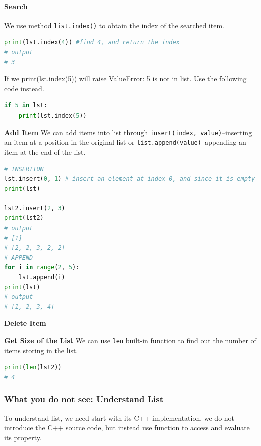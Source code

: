 \documentclass[../main.tex]{subfiles}
\begin{document}
\paragraph{Search} We use method \texttt{list.index()} to obtain the index of the searched item. 
\begin{lstlisting}[language = Python]
print(lst.index(4)) #find 4, and return the index
# output
# 3 
\end{lstlisting}
If we print(lst.index(5)) will raise ValueError: 5 is not in list. Use the following code instead.
\begin{lstlisting}[language=Python]
if 5 in lst:
    print(lst.index(5))
\end{lstlisting}
\textbf{Add Item } We can add items into list through \texttt{insert(index, value)}--inserting an item at a position in the original list or \texttt{list.append(value)}--appending an item at the end of the list. 
\begin{lstlisting}[language = Python]
# INSERTION
lst.insert(0, 1) # insert an element at index 0, and since it is empty lst.insert(1, 1) has the same effect
print(lst)

lst2.insert(2, 3)
print(lst2)
# output
# [1]
# [2, 2, 3, 2, 2]
# APPEND
for i in range(2, 5):
    lst.append(i)
print(lst)
# output
# [1, 2, 3, 4]
\end{lstlisting}

\textbf{Delete Item} 

\textbf{Get Size of the List} We can use \texttt{len} built-in function to find out the number of items storing in the list. 
\begin{lstlisting}[language=Python]
print(len(lst2))
# 4
\end{lstlisting}




\subsubsection{What you do not see: Understand List}
To understand list, we need start with its C++ implementation, we do not introduce the C++ source code, but instead use function to access and evaluate its property. 
\end{document}
